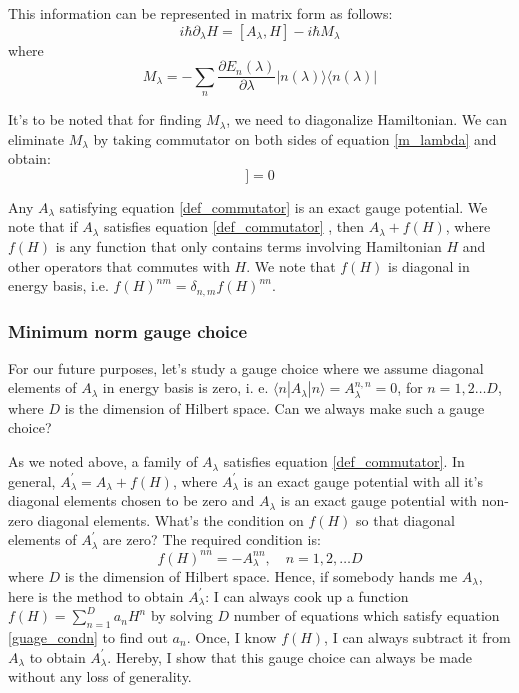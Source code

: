 \documentclass[11pt,a4paper]{article}
\begin{document}
This information can be represented in matrix form as follows:
\begin{equation}
i \hbar \partial_{\lambda} H= [ A_{\lambda}, H] -i \hbar M_{\lambda} 
\label{m_lambda}
\end{equation}
where 
\begin{equation}
M_{\lambda} = - \sum_n \dfrac{\partial E_n (\lambda)}{\partial \lambda} | n (\lambda) \rangle \langle n (\lambda) |
\end{equation}

It's to be noted that for finding $M_{\lambda}$, we need to diagonalize Hamiltonian. We can eliminate $M_{\lambda}$ by taking commutator on both sides of equation \ref{m_lambda} and obtain:
\begin{equation}
[H, i \hbar \partial_{\lambda}H - [A_{\lambda}, H]]=0
\label{def_commutator}
\end{equation}

Any $A_{\lambda}$ satisfying equation \ref{def_commutator} is an exact gauge potential. We note that  if $A_{\lambda}$ satisfies equation \ref{def_commutator} , then  $A_{\lambda}+ f(H)$, where $f(H)$ is any function that only contains terms involving Hamiltonian $H$ and other operators that commutes with $H$. We note that $f(H)$ is diagonal in energy basis, i.e. $f(H)^{nm}= \delta_{n,m} f(H)^{nn}$.
\subsubsection{Minimum norm gauge choice}
For our future purposes, let's study a gauge choice where we assume diagonal elements of $A_{\lambda}$ in energy basis is zero, i. e.  $ \langle n |A_{\lambda}|n\rangle= A_{\lambda}^{n,n} =0$, for $n=1,2 \ldots D$, where $D$ is the dimension of Hilbert space.  Can we always make such a gauge choice?

As we noted above,  a family of $A_{\lambda}$ satisfies equation \ref{def_commutator}. In general, $A_{\lambda}^{\prime}= A_{\lambda} + f(H)$, where $A_{\lambda}^{\prime}$  is an exact gauge potential with all it's diagonal elements chosen to be zero and $A_{\lambda}$ is an exact gauge potential with non-zero diagonal elements. What's the condition on $f(H)$ so that diagonal elements of $A_{\lambda}^{\prime}$  are zero? The required condition is:
\begin{equation}
 f(H)^{nn}= -A_{\lambda}^{nn}, \quad n=1,2, \ldots D
 \label{guage_condn}
\end{equation}
  where $D$ is the dimension of Hilbert space. Hence, if somebody hands me $A_{\lambda}$, here is the method to obtain $A_{\lambda}^{\prime}$: I can always cook up a function $f(H)= \sum_{n=1}^D a_n H^n$ by solving $D$ number of equations which satisfy equation \ref{guage_condn} to find out $a_n$. Once, I know $f(H)$, I can always subtract it from $A_{\lambda}$ to obtain $A_{\lambda}^{\prime}$. Hereby, I show that this gauge choice can always be made without any loss of generality.
\end{document}
